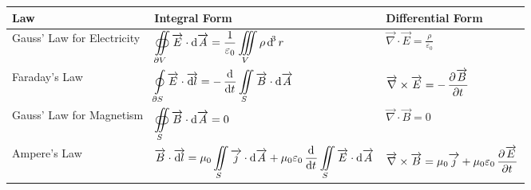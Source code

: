 \documentclass[fleqn, a4paper, 8pt, twoside]{amsart}
\theoremstyle{definition}
\theoremstyle{theorem}
\begin{document}
\doublespacing

\begin{tabular}{|l||l|l|}
	\hline
	Law                        & Integral Form                                                                                                                                                                                                                               & Differential Form                                                                                                                \\ [1.5ex]
	\hline
	Gauss' Law for Electricity & $\displaystyle \oiint\limits_{\partial V} \overrightarrow{E} \cdot \dif \overrightarrow{A} = \frac{1}{\varepsilon_0} \iiint\limits_{V} \rho \dif^3 r$                                                                                                                                       & $\overrightarrow{\nabla} \cdot \overrightarrow{E} = \frac{\rho}{\varepsilon_0}$                                                 \\ [1.5ex]

	Faraday's Law & $\displaystyle \oint\limits_{\partial S} \overrightarrow{E} \cdot \overrightarrow{\dif l} = -\dod{}{t} \iint\limits_{S} \overrightarrow{B} \cdot \dif \overrightarrow{A}$ & $\overrightarrow{\nabla} \times \overrightarrow{E} = -\dpd{\overrightarrow{B}}{t}$ \\ [1.5ex]

	Gauss' Law for Magnetism & $\displaystyle \oiint\limits_{S} \overrightarrow{B} \cdot \dif \overrightarrow{A} = 0$                                                                                                                                                      & $\overrightarrow{\nabla} \cdot \overrightarrow{B} = 0$                                                                           \\ [1.5ex]

	Ampere's Law               & $\displaystyle \overrightarrow{B} \cdot \overrightarrow{\dif l} = \mu_0 \iint\limits_{S} \overrightarrow{j} \cdot \dif \overrightarrow{A} + \mu_0 \varepsilon_0 \dod{}{t}\iint\limits_{S} \overrightarrow{E} \cdot \dif \overrightarrow{A}$ & $\overrightarrow{\nabla} \times \overrightarrow{B} = \mu_0 \overrightarrow{j} + \mu_0 \varepsilon_0 \dpd{\overrightarrow{E}}{t}$ \\ [1.5ex]

	\hline
\end{tabular}

\begin{multicols}{2}

\singlespacing

\end{multicols}
\end{document}
